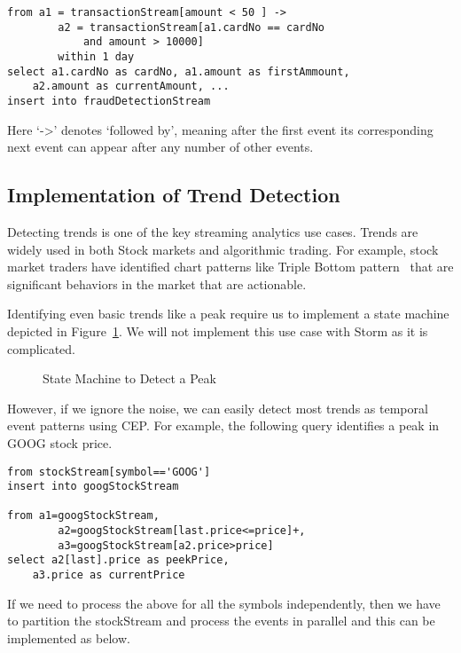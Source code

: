 \documentclass{sig-alternate}
\begin{document}
{\begin{lstlisting}[mathescape, showstringspaces=false]
from a1 = transactionStream[amount < 50 ] -> 
        a2 = transactionStream[a1.cardNo == cardNo 
        	and amount > 10000]
        within 1 day
select a1.cardNo as cardNo, a1.amount as firstAmmount, 
	a2.amount as currentAmount, ...
insert into fraudDetectionStream
\end{lstlisting} 

Here `->' denotes `followed by', meaning after the first event its corresponding next event can appear after any number of other events. 

\vspace{10 mm}

\subsection{Implementation of Trend Detection}

Detecting trends is one of the key streaming analytics use cases. Trends are widely used in both Stock markets and algorithmic trading. For example, stock market traders have identified chart patterns like Triple Bottom pattern~\cite{bulkowski2011encyclopedia} that are significant behaviors in the market that are actionable. 

Identifying even basic trends like a peak require us to implement a state machine depicted in Figure~\ref{fig:q4}. We will not implement this use case with Storm as it is complicated. 

\begin{figure}[!htbp]
\centering
{}
\caption{State Machine to Detect a Peak}
\label{fig:q4}
\end{figure}

However, if we ignore the noise, we can easily detect most trends as temporal event patterns using CEP. For example, the following query identifies a peak in GOOG stock price. 


\begin{lstlisting}[mathescape, showstringspaces=false]
from stockStream[symbol=='GOOG'] 
insert into googStockStream

from a1=googStockStream, 
        a2=googStockStream[last.price<=price]+,
        a3=googStockStream[a2.price>price]
select a2[last].price as peekPrice, 
	a3.price as currentPrice
\end{lstlisting} 

If we need to process the above for all the symbols independently, then we have to partition the stockStream and process the events in parallel and this can be implemented as below.

}
\end{document}
